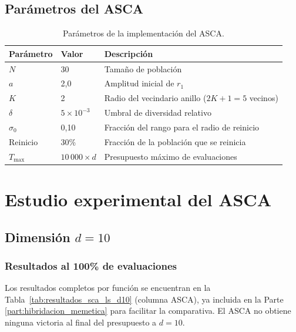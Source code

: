 \documentclass[12pt,a4paper]{article}
\begin{document}
\subsection{Parámetros del ASCA}

\begin{table}[H]
\centering
\renewcommand{\arraystretch}{1.3}
\begin{tabular}{lll}
\toprule
\textbf{Parámetro} & \textbf{Valor} & \textbf{Descripción} \\
\midrule
$N$                & 30                  & Tamaño de población \\
$a$                & 2{,}0               & Amplitud inicial de $r_1$ \\
$K$                & 2                   & Radio del vecindario anillo ($2K+1=5$ vecinos) \\
$\delta$           & $5 \times 10^{-3}$  & Umbral de diversidad relativo \\
$\sigma_0$         & 0{,}10              & Fracción del rango para el radio de reinicio \\
Reinicio           & 30\%                & Fracción de la población que se reinicia \\
$T_{\max}$         & $10\,000 \times d$  & Presupuesto máximo de evaluaciones \\
\bottomrule
\end{tabular}
\caption{Parámetros de la implementación del ASCA.}
\label{tab:parametros_asca}
\end{table}

\section{Estudio experimental del ASCA}
\label{sec:exp_asca}

\subsection{Dimensión $d = 10$}

\subsubsection{Resultados al 100\% de evaluaciones}

Los resultados completos por función se encuentran en la Tabla~\ref{tab:resultados_sca_ls_d10} (columna ASCA), ya incluida en la Parte \ref{part:hibridacion_memetica} para facilitar la comparativa. El ASCA no obtiene ninguna victoria al final del presupuesto a $d=10$.
\end{document}
